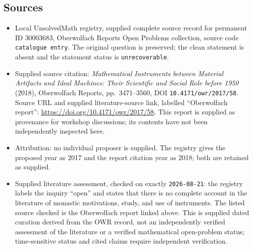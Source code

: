 \documentclass[11pt]{article}
\begin{document}
\subsection{Sources}
\begin{itemize}
\item Local UnsolvedMath registry, supplied complete source record for permanent ID \(30003683\), Oberwolfach Reports Open Problems collection, source code \texttt{catalogue entry}. The original question is preserved; the clean statement is absent and the statement status is \texttt{unrecoverable}.
\item Supplied source citation: \emph{Mathematical Instruments between Material Artifacts and Ideal Machines: Their Scientific and Social Role before 1950} (2018), Oberwolfach Reports, pp.\ 3471--3560, DOI \texttt{10.4171/owr/2017/58}. Source URL and supplied literature-source link, labelled ``Oberwolfach report'': \url{https://doi.org/10.4171/owr/2017/58}. This report is supplied as provenance for workshop discussions; its contents have not been independently inspected here.
\item Attribution: no individual proposer is supplied. The registry gives the proposed year as 2017 and the report citation year as 2018; both are retained as supplied.
\item Supplied literature assessment, checked on exactly \texttt{2026-08-21}: the registry labels the inquiry ``open'' and states that there is no complete account in the literature of monastic motivations, study, and use of instruments. The listed source checked is the Oberwolfach report linked above. This is supplied dated curation derived from the OWR record, not an independently verified assessment of the literature or a verified mathematical open-problem status; time-sensitive status and cited claims require independent verification.
\end{itemize}
\end{document}
